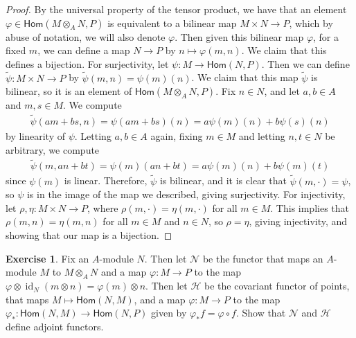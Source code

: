 \documentclass[psamsfonts]{amsart}
\theoremstyle{definition}
\newtheorem{exer}[thm]{Exercise}
\theoremstyle{remark}
\renewcommand{\hom}{\mathsf{Hom}}
\DeclareMathOperator{\id}{id}
\begin{document}
\begin{proof}
By the universal property of the tensor product, we have that an element $\varphi \in \hom(M \otimes_A N, P)$ is equivalent to a bilinear map $M \times N \to P$, which by abuse of notation, we will also denote $\varphi$. Then given this bilinear map $\varphi$, for a fixed $m$, we can define a map $N \to P$ by $n \mapsto \varphi(m,n)$. We claim that this defines a bijection. For surjectivity, let $\psi : M \to \hom(N,P)$. Then we can define $\tilde{\psi} : M \times N \to P$ by $\tilde{\psi}(m,n) = \psi(m)(n)$. We claim that this map $\tilde{\psi}$ is bilinear, so it is an element of $\hom(M \otimes_A N, P)$. Fix $n \in N$, and let $a,b \in A$ and $m,s \in M$. We compute
\begin{align*}
\tilde{\psi}(am + bs, n) = \psi(am + bs)(n) = a\psi(m)(n) + b\psi(s)(n)
\end{align*}
by linearity of $\psi$.
Letting  $a,b \in A$ again, fixing $m \in M$ and letting $n,t \in N$ be arbitrary, we compute
\begin{align*}
\tilde{\psi}(m, an + bt) = \psi(m)(an + bt) = a\psi(m)(n) + b\psi(m)(t)
\end{align*}
since $\psi(m)$ is linear. Therefore, $\tilde{\psi}$ is bilinear, and it is clear that $\tilde{\psi}(m, \cdot) = \psi$, so $\psi$ is in the image of the map we described, giving surjectivity. For injectivity, let $\rho,\eta : M\times N \to P$, where $\rho(m,\cdot) = \eta(m, \cdot)$ for all $m \in M$. This implies that $\rho(m,n) = \eta(m,n)$ for all $m \in M$ and $n \in N$, so $\rho = \eta$, giving injectivity, and showing that our map is a bijection.
\end{proof}
%
\begin{exer}
Fix an  $A$-module $N$. Then let $\mathcal{N}$ be the functor that maps an $A$-module $M$ to $M \otimes_A N$ and a map $\varphi : M \to P$ to the map $\varphi \otimes \id_N(m \otimes n) = \varphi(m) \otimes n$. Then let $\mathcal{H}$ be the covariant functor of points, that maps $M \mapsto \hom(N,M)$, and a map $\varphi : M \to P$ to the map $\varphi_*: \hom(N,M) \to \hom(N,P)$ given by $\varphi_*f = \varphi \circ f$. Show that $\mathcal{N}$ and $\mathcal{H}$ define adjoint functors.
\end{exer}
%
\end{document}
